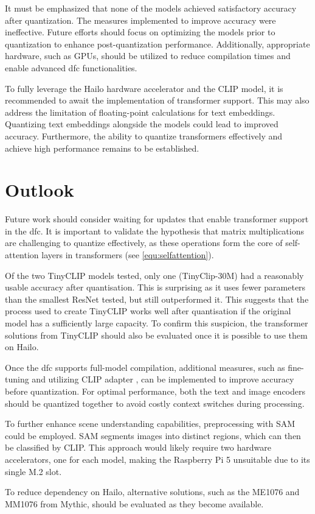 It must be emphasized that none of the models achieved satisfactory accuracy after quantization.  
The measures implemented to improve accuracy were ineffective.  
Future efforts should focus on optimizing the models prior to quantization to enhance post-quantization performance.  
Additionally, appropriate hardware, such as GPUs, should be utilized to reduce compilation times and enable advanced \acrshort{dfc} functionalities.  

To fully leverage the Hailo hardware accelerator and the CLIP model, it is recommended to await the implementation of transformer support.  
This may also address the limitation of floating-point calculations for text embeddings.  
Quantizing text embeddings alongside the models could lead to improved accuracy.  
Furthermore, the ability to quantize transformers effectively and achieve high performance remains to be established.  

\section{Outlook}  
Future work should consider waiting for updates that enable transformer support in the \acrshort{dfc}.  
It is important to validate the hypothesis that matrix multiplications are challenging to quantize effectively, as these operations form the core of self-attention layers in transformers (see \cref{equ:selfattention}).  

Of the two TinyCLIP models tested, only one (TinyClip-30M) had a reasonably usable accuracy after quantisation.
This is surprising as it uses fewer parameters than the smallest ResNet tested, but still outperformed it.
This suggests that the process used to create TinyCLIP works well after quantisation if the original model has a sufficiently large capacity.
To confirm this suspicion, the transformer solutions from TinyCLIP should also be evaluated once it is possible to use them on Hailo.

Once the \acrshort{dfc} supports full-model compilation, additional measures, such as fine-tuning and utilizing CLIP adapter \cite{clipadapter}, can be implemented to improve accuracy before quantization.  
For optimal performance, both the text and image encoders should be quantized together to avoid costly context switches during processing.  

To further enhance scene understanding capabilities, preprocessing with SAM \cite{sam} could be employed.  
SAM segments images into distinct regions, which can then be classified by CLIP.  
This approach would likely require two hardware accelerators, one for each model, making the Raspberry Pi 5 unsuitable due to its single M.2 slot.  

To reduce dependency on Hailo, alternative solutions, such as the ME1076 and MM1076 from Mythic, should be evaluated as they become available.  


